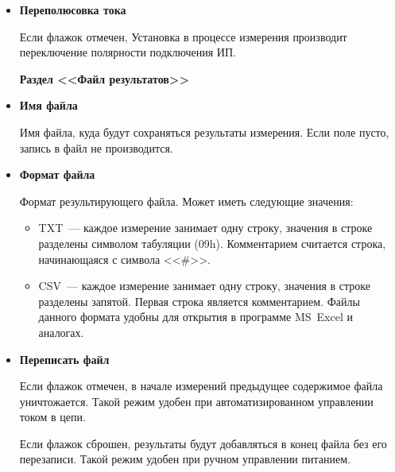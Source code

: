 \documentclass[12pt, a4paper, twocolumn]{report}
\newcommand{\PARAM}[1]{\item {\bf #1} }
\newcommand{\PARAMSECTION}[1]{\vbox{}{\bf Раздел <<#1>>}}
\begin{document}
\begin{itemize}
\PARAM{Переполюсовка тока}

Если флажок отмечен, Установка в процессе измерения производит переключение полярности подключения ИП.

\PARAMSECTION{Файл результатов}

\PARAM{Имя файла}

Имя файла, куда будут сохраняться результаты измерения. Если поле пусто, запись в файл не производится.

\PARAM{Формат файла}

Формат результирующего файла. Может иметь следующие значения:

\begin{itemize}
\item TXT~--- каждое измерение занимает одну строку, значения в строке разделены символом табуляции (09h). Комментарием считается строка, начинающаяся с символа <<\#>>.
\item CSV~--- каждое измерение занимает одну строку, значения в строке разделены запятой. Первая строка является комментарием. Файлы данного формата удобны для открытия в программе MS~Excel и аналогах.
\end{itemize}

\PARAM{Переписать файл}

Если флажок отмечен, в начале измерений предыдущее содержимое файла уничтожается. Такой режим удобен при автоматизированном управлении током в цепи.

Если флажок сброшен, результаты будут добавляться в конец файла без его перезаписи. Такой режим удобен при ручном управлении питанием.

\end{itemize}
\end{document}

